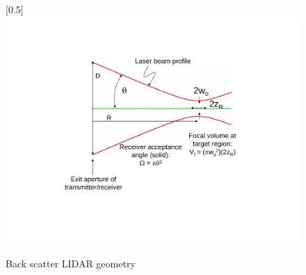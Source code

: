 \begin{figure}
\scalebox{0.5}[0.5]{
\includegraphics[bb=-20 120 289 250]
{back_scatter/back_scatter.pdf}
}
\caption{Back scatter LIDAR geometry}
\label{back_scatter}
\end{figure}
